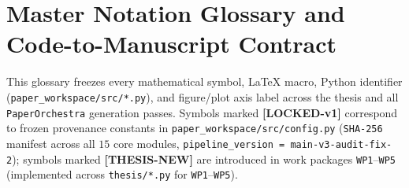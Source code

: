 \ifdefined\NOTATIONMACROSONLY\else

\section*{Master Notation Glossary and Code-to-Manuscript Contract}
\label{sec:notation_glossary}

{\sloppy
This glossary freezes every mathematical symbol, LaTeX macro, Python identifier
(\texttt{paper\_workspace/src/*.py}), and figure/plot axis label across the thesis
and all \texttt{PaperOrchestra} generation passes. Symbols marked \textbf{[LOCKED-v1]}
correspond to frozen provenance constants in \texttt{paper\_workspace/src/config.py}
(\texttt{SHA-256} manifest across all $15$ core modules, \texttt{pipeline\_version = main-v3-audit-fix-2});
symbols marked \textbf{[THESIS-NEW]} are introduced in work packages \texttt{WP1}--\texttt{WP5}
(implemented across \texttt{thesis/*.py} for \texttt{WP1}--\texttt{WP5}).
\par}


